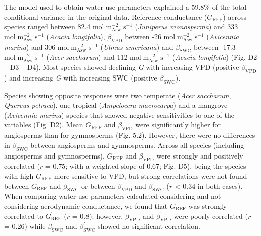 \documentclass[11pt,twoside]{reedthesis}
\begin{document}
The model used to obtain water use parameters explained a 59.8\% of the
total conditional variance in the original data. Reference conductance
(\(G_{\text{REF}}\)) across species ranged between 82.4
\(\text{mol}\; \text{m}_{\text{Asw}}^{-2}\; \text{s}^{-1}\)
(\emph{Juniperus monosperma}) and 333
\(\text{mol}\; \text{m}_{\text{Asw}}^{-2}\; \text{s}^{-1}\)
(\emph{Acacia longifolia}), \(\beta_{\text{VPD}}\) between -26
\(\text{mol}\; \text{m}_{\text{Asw}}^{-2}\; \text{s}^{-1}\)
(\emph{Avicennia marina}) and 306
\(\text{mol}\; \text{m}_{\text{Asw}}^{-2}\; \text{s}^{-1}\) (\emph{Ulmus
americana}) and \(\beta_{\text{SWC}}\) between -17.3
\(\text{mol}\; \text{m}_{\text{Asw}}^{-2}\; \text{s}^{-1}\) (\emph{Acer
saccharum}) and 112
\(\text{mol}\; \text{m}_{\text{Asw}}^{-2}\; \text{s}^{-1}\)
(\emph{Acacia longifolia}) (Fig. D2 -- D3 -- D4). Most species showed
declining \emph{G} with increasing VPD (positive \(\beta_{\text{VPD}}\))
and increasing \emph{G} with increasing SWC (positive
\(\beta_{\text{SWC}}\)).\par

Species showing opposite responses were two temperate (\emph{Acer
saccharum}, \emph{Quercus petraea}), one tropical (\emph{Ampelocera
macrocarpa}) and a mangrove (\emph{Avicennia marina}) species that
showed negative sensitivities to one of the variables (Fig. D2). Mean
\(G_{\text{REF}}\) and \(\beta_{\text{VPD}}\) were significantly higher
for angiosperms than for gymnosperms (Fig. 5.2). However, there were no
differences in \(\beta_{\text{SWC}}\) between angiosperms and
gymnosperms. Across all species (including angiosperms and gymnosperms),
\(G_{\text{REF}}\) and \(\beta_{\text{VPD}}\) were strongly and
positively correlated (\(r\) = 0.75; with a weighted slope of 0.67; Fig.
D5), being the species with high \(G_{\text{REF}}\) more sensitive to
VPD, but strong correlations were not found between \(G_{\text{REF}}\)
and \(\beta_{\text{SWC}}\) or between \(\beta_{\text{VPD}}\) and
\(\beta_{\text{SWC}}\) (\textbar{}\(r\)\textbar{} \textless{} 0.34 in
both cases). When comparing water use parameters calculated considering
and not considering aerodynamic conductance, we found that
\(G_{\text{REF}}\) was strongly correlated to \(G_{\text{REF}}^{'}\)
(\(r\) = 0.8); however, \(\beta_{\text{VPD}}\) and
\(\beta_{\text{VPD}}^{'}\) were poorly correlated (\(r\) = 0.26) while
\(\beta_{\text{SWC}}\) and \(\beta_{\text{SWC}}^{'}\) showed no
significant correlation.\par
\end{document}
